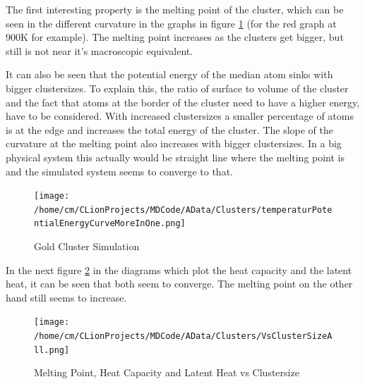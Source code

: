\par 
The first interesting property is the melting point of the cluster, which can be seen in the different curvature in the graphs in figure \ref{GoldClusterSimulationTemperaturEnergy4In1} (for the red graph at 900K for example). The melting point increases as the clusters get bigger, but still is not near it's macroscopic equivalent. 

\par
It can also be seen that the potential energy of the median atom sinks with bigger clustersizes. To explain this, the ratio of surface to volume of the cluster and the fact that atoms at the border of the cluster need to have a higher energy, have to be considered. With increased clustersizes a smaller percentage of atoms is at the edge and increases the total energy of the cluster. 
The slope of the curvature at the melting point also increases with bigger clustersizes. In a big physical system this actually would be straight line where the melting point is and the simulated system seems to converge to that. 

\begin{figure}
	\begin{center} 
		\texttt{[image: /home/cm/CLionProjects/MDCode/AData/Clusters/temperaturPotentialEnergyCurveMoreInOne.png]} 
	\end{center} 
	\caption[Gold Cluster Simulation]{Gold Cluster Simulation} 
	\label{GoldClusterSimulationTemperaturEnergy4In1} 
\end{figure} 

In the next figure \ref{GoldClusterSimulationVsClustersize} in the diagrams which plot the heat capacity and the latent heat, it can be seen that both seem to converge. The melting point on the other hand still seems to increase. 

\begin{figure}
	\begin{center} 
		\texttt{[image: /home/cm/CLionProjects/MDCode/AData/Clusters/VsClusterSizeAll.png]} 
	\end{center} 
	\caption[Melting Point, Heat Capacity and Latent Heat vs Clustersize]{Melting Point, Heat Capacity and Latent Heat vs Clustersize} 
	\label{GoldClusterSimulationVsClustersize} 
\end{figure} 
